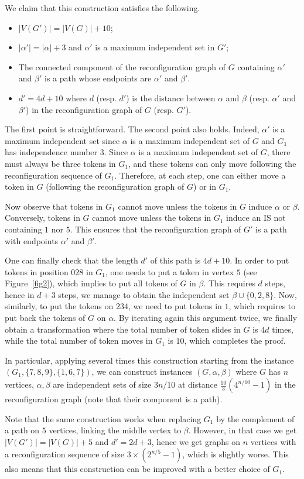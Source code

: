 \documentclass{article}
\begin{document}
We claim that this construction satisfies the following.

  \begin{itemize}
  \item $|V(G')|=|V(G)|+10$;
  \item $|\alpha'|=|\alpha|+3$ and $\alpha'$ is a maximum independent set in $G'$;
  \item The connected component of the reconfiguration graph of $G$ containing $\alpha'$ and $\beta'$ is a path whose endpoints are $\alpha'$ and $\beta'$.
  \item $d'=4d+10$ where $d$ (resp. $d'$) is the distance between $\alpha$ and $\beta$ (resp. $\alpha'$ and $\beta'$) in the reconfiguration graph of $G$ (resp. $G'$).
  \end{itemize}

  The first point is straightforward. The second point also holds. Indeed, $\alpha'$ is a maximum independent set since $\alpha$ is a maximum independent set of $G$ and $G_1$ has independence number $3$. Since $\alpha$ is a maximum independent set of $G$, there must always be three tokens in $G_1$, and these tokens can only move following the reconfiguration sequence of $G_1$. Therefore, at each step, one can either move a token in $G$ (following the reconfiguration graph of $G$) or in $G_1$.
  
  Now observe that tokens in $G_1$ cannot move unless the tokens in $G$ induce $\alpha$ or $\beta$. Conversely, tokens in $G$ cannot move unless the tokens in $G_1$ induce an IS not containing $1$ nor $5$. This ensures that the reconfiguration graph of $G'$ is a path with endpoints $\alpha'$ and $\beta'$. 
  
  One can finally check that the length $d'$ of this path is $4d+10$. In order to put tokens in position $028$ in $G_1$, one needs to put a token in vertex $5$ (see Figure~\ref{fig2}), which implies to put all tokens of $G$ in $\beta$. This requires $d$ steps, hence in $d+3$ steps, we manage to obtain the independent set $\beta\cup\{0,2,8\}$. Now, similarly, to put the tokens on $234$, we need to put tokens in $1$, which requires to put back the tokens of $G$ on $\alpha$. By iterating again this argument twice, we finally obtain a transformation where the total number of token slides in $G$ is $4d$ times, while the total number of token moves in $G_1$ is $10$, which completes the proof. 
  \medskip
  
In particular, applying several times this construction starting from
the instance $(G_1,\{7,8,9\},\{1,6,7\})$, we can construct instances
$(G,\alpha,\beta)$ where $G$ has $n$ vertices, $\alpha,\beta$ are independent sets of size $3n/10$ at distance $\frac{10}{3}(4^{n/10}-1)$ in the
reconfiguration graph (note that their component is a path).

Note that the same construction works when replacing $G_1$ by the complement of a path on $5$ vertices, linking the middle vertex to $\beta$. However, in that case we get $|V(G')|=|V(G)|+5$ and $d'=2d+3$, hence we get graphs on $n$ vertices with a reconfiguration sequence of size $3\times(2^{n/5}-1)$, which is slightly worse. This also means that this construction can be improved with a better choice of $G_1$.
\end{document}
